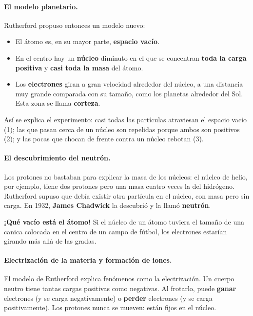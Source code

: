 \paragraph{El modelo planetario.} Rutherford propuso entonces un modelo nuevo:
\begin{itemize}
    \item El átomo es, en su mayor parte, \textbf{espacio vacío}.
    \item En el centro hay un \textbf{núcleo} diminuto en el que se concentran \textbf{toda la carga positiva} y \textbf{casi toda la masa} del átomo.
    \item Los \textbf{electrones} giran a gran velocidad alrededor del núcleo, a una distancia muy grande comparada con su tamaño, como los planetas alrededor del Sol. Esta zona se llama \textbf{corteza}.
\end{itemize}

Así se explica el experimento: casi todas las partículas atraviesan el espacio vacío (1); las que pasan cerca de un núcleo son repelidas porque ambos son positivos (2); y las pocas que chocan de frente contra un núcleo rebotan (3).

\paragraph{El descubrimiento del neutrón.} Los protones no bastaban para explicar la masa de los núcleos: el núcleo de helio, por ejemplo, tiene dos protones pero una masa cuatro veces la del hidrógeno. Rutherford supuso que debía existir otra partícula en el núcleo, con masa pero sin carga. En 1932, \textbf{James Chadwick} la descubrió y la llamó \textbf{neutrón}.

\begin{remark}
    \textbf{¡Qué vacío está el átomo!} Si el núcleo de un átomo tuviera el tamaño de una canica colocada en el centro de un campo de fútbol, los electrones estarían girando más allá de las gradas.
\end{remark}

\paragraph{Electrización de la materia y formación de iones.} El modelo de Rutherford explica fenómenos como la electrización. Un cuerpo neutro tiene tantas cargas positivas como negativas. Al frotarlo, puede \textbf{ganar} electrones (y se carga negativamente) o \textbf{perder} electrones (y se carga positivamente). Los protones nunca se mueven: están fijos en el núcleo.

